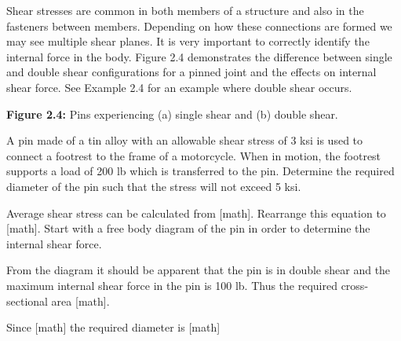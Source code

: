 \documentclass[
  letterpaper,
  DIV=11,
  numbers=noendperiod]{scrreprt}
\begin{document}
Shear stresses are common in both members of a structure and also in the
fasteners between members. Depending on how these connections are formed
we may see multiple shear planes. It is very important to correctly
identify the internal force in the body. Figure 2.4 demonstrates the
difference between single and double shear configurations for a pinned
joint and the effects on internal shear force. See Example 2.4 for an
example where double shear occurs.

\textbf{Figure 2.4:} Pins experiencing (a) single shear and (b) double
shear.

\begin{tcolorbox}[enhanced jigsaw, colback=white, colframe=quarto-callout-note-color-frame, leftrule=.75mm, opacitybacktitle=0.6, colbacktitle=quarto-callout-note-color!10!white, arc=.35mm, bottomrule=.15mm, breakable, title={Example 2.4: Shear stress with double shear}, left=2mm, titlerule=0mm, toptitle=1mm, toprule=.15mm, opacityback=0, rightrule=.15mm, coltitle=black, bottomtitle=1mm]

A pin made of a tin alloy with an allowable shear stress of 3 ksi is
used to connect a footrest to the frame of a motorcycle. When in motion,
the footrest supports a load of 200 lb which is transferred to the pin.
Determine the required diameter of the pin such that the stress will not
exceed 5 ksi.

\begin{tcolorbox}[enhanced jigsaw, colback=white, colframe=quarto-callout-note-color-frame, leftrule=.75mm, opacitybacktitle=0.6, colbacktitle=quarto-callout-note-color!10!white, arc=.35mm, bottomrule=.15mm, breakable, title={Solution}, left=2mm, titlerule=0mm, toptitle=1mm, toprule=.15mm, opacityback=0, rightrule=.15mm, coltitle=black, bottomtitle=1mm]

Average shear stress can be calculated from {[}math{]}. Rearrange this
equation to {[}math{]}. Start with a free body diagram of the pin in
order to determine the internal shear force.

From the diagram it should be apparent that the pin is in double shear
and the maximum internal shear force in the pin is 100 lb. Thus the
required cross-sectional area {[}math{]}.

Since {[}math{]} the required diameter is {[}math{]}

\end{tcolorbox}

\end{tcolorbox}
\end{document}
